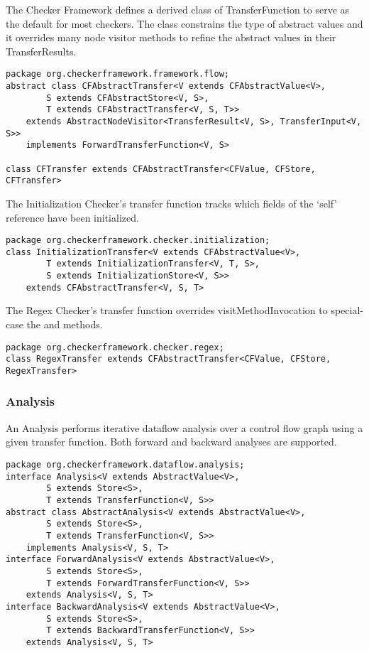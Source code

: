 The Checker Framework defines a derived class of TransferFunction to
serve as the default for most checkers.  The class constrains the type
of abstract values and it overrides many node visitor methods to
refine the abstract values in their TransferResults.

\begin{verbatim}
package org.checkerframework.framework.flow;
abstract class CFAbstractTransfer<V extends CFAbstractValue<V>,
        S extends CFAbstractStore<V, S>,
        T extends CFAbstractTransfer<V, S, T>>
    extends AbstractNodeVisitor<TransferResult<V, S>, TransferInput<V, S>>
    implements ForwardTransferFunction<V, S>

class CFTransfer extends CFAbstractTransfer<CFValue, CFStore, CFTransfer>
\end{verbatim}

The Initialization Checker's transfer function tracks which fields of
the `self' reference have been initialized.

\begin{verbatim}
package org.checkerframework.checker.initialization;
class InitializationTransfer<V extends CFAbstractValue<V>,
        T extends InitializationTransfer<V, T, S>,
        S extends InitializationStore<V, S>>
    extends CFAbstractTransfer<V, S, T>
\end{verbatim}

The Regex Checker's transfer function overrides visitMethodInvocation
to special-case the  and  methods.

\begin{verbatim}
package org.checkerframework.checker.regex;
class RegexTransfer extends CFAbstractTransfer<CFValue, CFStore, RegexTransfer>
\end{verbatim}


\subsubsection{Analysis}
\label{sec:analysis_classes}

An Analysis performs iterative dataflow analysis over a control flow
graph using a given transfer function.  Both forward and backward
analyses are supported.

\begin{verbatim}
package org.checkerframework.dataflow.analysis;
interface Analysis<V extends AbstractValue<V>,
        S extends Store<S>,
        T extends TransferFunction<V, S>>
abstract class AbstractAnalysis<V extends AbstractValue<V>,
        S extends Store<S>,
        T extends TransferFunction<V, S>>
    implements Analysis<V, S, T>
interface ForwardAnalysis<V extends AbstractValue<V>,
        S extends Store<S>,
        T extends ForwardTransferFunction<V, S>>
    extends Analysis<V, S, T>
interface BackwardAnalysis<V extends AbstractValue<V>,
        S extends Store<S>,
        T extends BackwardTransferFunction<V, S>>
    extends Analysis<V, S, T>
\end{verbatim}

